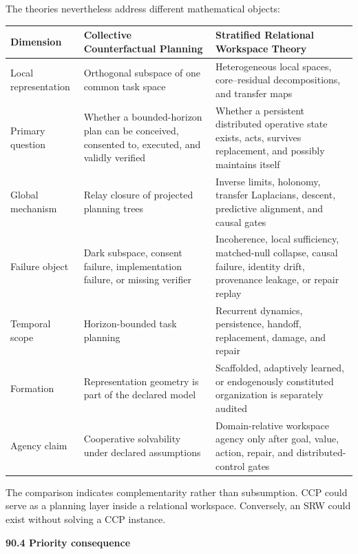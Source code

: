 \documentclass[11pt,letterpaper]{article}
\newcommand{\subtopic}[1]{%
 \vspace{0.45em}
 {\bfseries\color{AccentColor} #1\par}
}
\theoremstyle{plain}
\theoremstyle{definition}
\begin{document}
The theories nevertheless address different mathematical objects:
\begin{center}
\small
\begin{tabularx}{\textwidth}{@{}>{\raggedright\arraybackslash}p{}>{\raggedright\arraybackslash}X>{\raggedright\arraybackslash}X@{}}
\toprule
Dimension & Collective Counterfactual Planning & Stratified Relational Workspace Theory \\
\midrule
Local representation & Orthogonal subspace of one common task space & Heterogeneous local spaces, core--residual decompositions, and transfer maps \\
Primary question & Whether a bounded-horizon plan can be conceived, consented to, executed, and validly verified & Whether a persistent distributed operative state exists, acts, survives replacement, and possibly maintains itself \\
Global mechanism & Relay closure of projected planning trees & Inverse limits, holonomy, transfer Laplacians, descent, predictive alignment, and causal gates \\
Failure object & Dark subspace, consent failure, implementation failure, or missing verifier & Incoherence, local sufficiency, matched-null collapse, causal failure, identity drift, provenance leakage, or repair replay \\
Temporal scope & Horizon-bounded task planning & Recurrent dynamics, persistence, handoff, replacement, damage, and repair \\
Formation & Representation geometry is part of the declared model & Scaffolded, adaptively learned, or endogenously constituted organization is separately audited \\
Agency claim & Cooperative solvability under declared assumptions & Domain-relative workspace agency only after goal, value, action, repair, and distributed-control gates \\
\bottomrule
\end{tabularx}
\end{center}
The comparison indicates complementarity rather than subsumption. CCP could
serve as a planning layer inside a relational workspace. Conversely, an SRW
could exist without solving a CCP instance.

\subtopic{90.4 Priority consequence}
\end{document}
